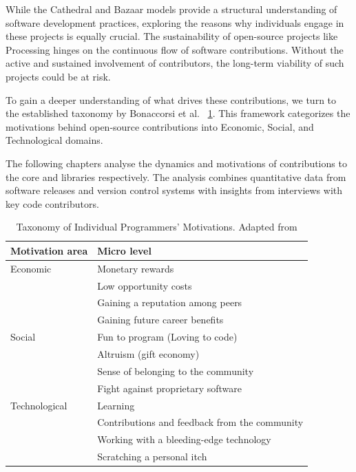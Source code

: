 While the Cathedral and Bazaar models provide a structural understanding of software development practices, exploring the reasons why individuals engage in these projects is equally crucial. The sustainability of open-source projects like Processing hinges on the continuous flow of software contributions. Without the active and sustained involvement of contributors, the long-term viability of such projects could be at risk.

To gain a deeper understanding of what drives these contributions, we turn to the established taxonomy by Bonaccorsi et al. \parencite{bonaccorsiComparingMotivationsIndividual2006} ~\ref{tab:taxonomy}. This framework categorizes the motivations behind open-source contributions into Economic, Social, and Technological domains. 

The following chapters analyse the dynamics and motivations of contributions to the core and libraries respectively. The analysis combines quantitative data from software releases and version control systems with insights from interviews with key code contributors.

\begin{table}
    \begin{tabularx}{\textwidth}{l l} 
    \toprule
    Motivation area & Micro level \\
    \midrule
    Economic & Monetary rewards \\
     & Low opportunity costs \\
     & Gaining a reputation among peers \\
     & Gaining future career benefits \\
    \midrule
    Social & Fun to program (Loving to code) \\
     & Altruism (gift economy) \\
     & Sense of belonging to the community \\
     & Fight against proprietary software \\
    \midrule
    Technological & Learning \\
     & Contributions and feedback from the community \\
     & Working with a bleeding-edge technology \\
     & Scratching a personal itch \\
    \bottomrule
    \end{tabularx} 
    \label{tab:taxonomy}
    \caption{Taxonomy of Individual Programmers’ Motivations. Adapted from \parencite{bonaccorsiComparingMotivationsIndividual2006}}
\end{table}

